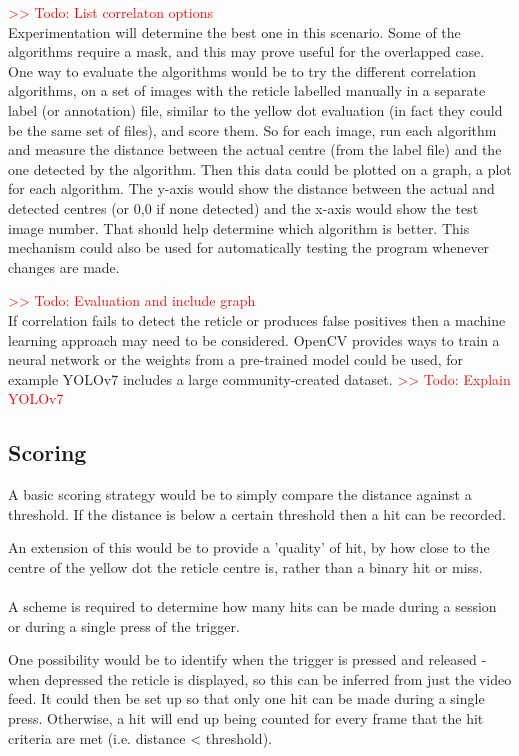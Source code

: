 \documentclass[final]{cmpreport_02}
\begin{document}
\noindent
\textcolor{red}{>> Todo: List correlaton options}\\
Experimentation will determine the best one in this scenario. Some of the algorithms require a mask, and this may prove useful for the overlapped case. One way to evaluate the algorithms would be to try the different correlation algorithms, on a set of images with the reticle labelled manually in a separate label (or annotation) file, similar to the yellow dot evaluation (in fact they could be the same set of files), and score them. So for each image, run each algorithm and measure the distance between the actual centre (from the label file) and the one detected by the algorithm. Then this data could be plotted on a graph, a plot for each algorithm. The y-axis would show the distance between the actual and detected centres (or 0,0 if none detected) and the x-axis would show the test image number. That should help determine which algorithm is better. This mechanism could also be used for automatically testing the program whenever changes are made.

\noindent
\textcolor{red}{>> Todo: Evaluation and include graph}\\
If correlation fails to detect the reticle or produces false positives then a machine learning approach may need to be considered. OpenCV provides ways to train a neural network or the weights from a pre-trained model could be used, for example YOLOv7 includes a large community-created dataset. \textcolor{red}{>> Todo: Explain YOLOv7}

\subsection{Scoring}

A basic scoring strategy would be to simply compare the distance against a threshold. If the distance is below a certain threshold then a hit can be recorded.

An extension of this would be to provide a 'quality' of hit, by how close to the centre of the yellow dot the reticle centre is, rather than a binary hit or miss.
\\\\
A scheme is required to determine how many hits can be made during a session or during a single press of the trigger.

One possibility would be to identify when the trigger is pressed and released - when depressed the reticle is displayed, so this can be inferred from just the video feed. It could then be set up so that only one hit can be made during a single press. Otherwise, a hit will end up being counted for every frame that the hit criteria are met (i.e. distance < threshold).
\end{document}
